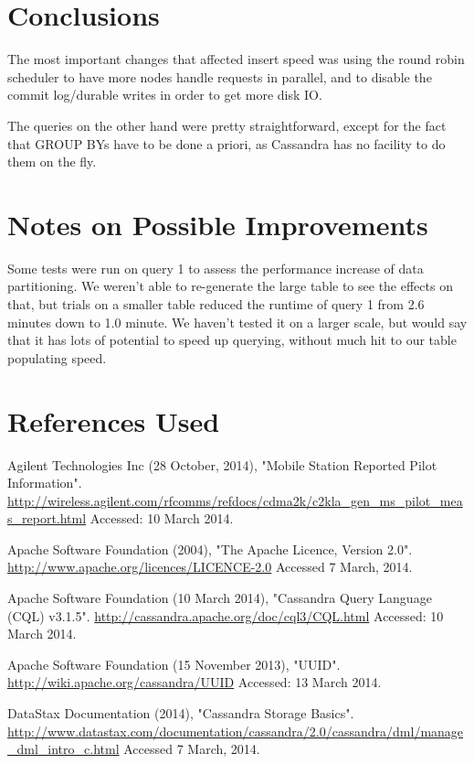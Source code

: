 \documentclass[letterpaper]{article}
\begin{document}
\section{Conclusions}

The most important changes that affected insert speed was using the round
robin scheduler to have more nodes handle requests in parallel, and to disable
the commit log/durable writes in order to get more disk IO.

The queries on the other hand were pretty straightforward, except for the fact
that GROUP BYs have to be done a priori, as Cassandra has no facility to do
them on the fly.

\section{Notes on Possible Improvements}

Some tests were run on query 1 to assess the performance increase of data
partitioning. We weren't able to re-generate the large table to see the effects
on that, but trials on a smaller table reduced the runtime of query 1 from 2.6
minutes down to 1.0 minute. We haven't tested it on a larger scale, but would
say that it has lots of potential to speed up querying, without much hit to our
table populating speed.

\section{References Used}

Agilent Technologies Inc (28 October, 2014), "Mobile Station Reported Pilot Information".
\url{http://wireless.agilent.com/rfcomms/refdocs/cdma2k/c2kla_gen_ms_pilot_meas_report.html}
Accessed: 10 March 2014.

Apache Software Foundation (2004), "The Apache Licence, Version 2.0".
\url{http://www.apache.org/licences/LICENCE-2.0}
Accessed 7 March, 2014.

Apache Software Foundation (10 March 2014), "Cassandra Query Language (CQL) v3.1.5".
\url{http://cassandra.apache.org/doc/cql3/CQL.html}
Accessed: 10 March 2014.

Apache Software Foundation (15 November 2013), "UUID".
\url{http://wiki.apache.org/cassandra/UUID}
Accessed: 13 March 2014.

DataStax Documentation (2014), "Cassandra Storage Basics".
\url{http://www.datastax.com/documentation/cassandra/2.0/cassandra/dml/manage_dml_intro_c.html}
Accessed 7 March, 2014.
\end{document}

